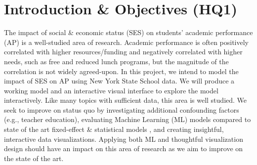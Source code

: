 \documentclass[sigconf,nonacm,11pt]{acmart}
\begin{document}



\maketitle



\section{Introduction \& Objectives (HQ1)}

The impact of  social \& economic status (SES) on students' academic performance (AP) is a well-studied area of research.  Academic performance is often positively correlated with higher resources/funding \cite{jinnai}and negatively correlated with higher needs, such as free and reduced lunch programs\cite{sirin}, but the magnitude of the correlation is not widely agreed-upon. In this project, we intend to model the impact of SES on AP using New York State School data. We will produce a working model and an interactive visual interface to explore the model interactively. Like many topics with sufficient data, this area is well studied. We seek to improve on status quo by investigating additional confounding factors (e.g., teacher education), evaluating Machine Learning (ML) models compared to state of the art fixed-effect \& statistical models \cite{hearn, farooq}, and creating insightful, interactive data visualizations. Applying both ML and thoughtful visualization design should have an impact on this area of research as we aim to improve on the state of the art.
\end{document}

